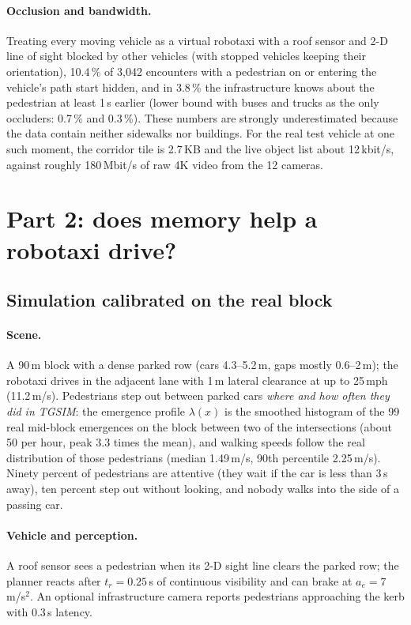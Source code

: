 \documentclass[11pt,a4paper]{article}
\newcommand{\pct}{\,\%}
\begin{document}
\paragraph{Occlusion and bandwidth.}
Treating every moving vehicle as a virtual robotaxi with a roof sensor and 2-D line of sight blocked by other vehicles (with stopped vehicles keeping their orientation), 10.4\pct{} of 3{,}042 encounters with a pedestrian on or entering the vehicle's path start hidden, and in 3.8\pct{} the infrastructure knows about the pedestrian at least 1\,s earlier (lower bound with buses and trucks as the only occluders: 0.7\pct{} and 0.3\pct). These numbers are strongly underestimated because the data contain neither sidewalks nor buildings.
For the real test vehicle at one such moment, the corridor tile is 2.7\,KB and the live object list about 12\,kbit/s, against roughly 180\,Mbit/s of raw 4K video from the 12 cameras.

\section{Part 2: does memory help a robotaxi drive?}
\label{sec:sim}

\subsection{Simulation calibrated on the real block}

\paragraph{Scene.}
A 90\,m block with a dense parked row (cars 4.3--5.2\,m, gaps mostly 0.6--2\,m); the robotaxi drives in the adjacent lane with 1\,m lateral clearance at up to 25\,mph (11.2\,m/s).
Pedestrians step out between parked cars \emph{where and how often they did in TGSIM}: the emergence profile $\lambda(x)$ is the smoothed histogram of the 99 real mid-block emergences on the block between two of the intersections (about 50 per hour, peak 3.3 times the mean), and walking speeds follow the real distribution of those pedestrians (median 1.49\,m/s, 90th percentile 2.25\,m/s).
Ninety percent of pedestrians are attentive (they wait if the car is less than 3\,s away), ten percent step out without looking, and nobody walks into the side of a passing car.

\paragraph{Vehicle and perception.}
A roof sensor sees a pedestrian when its 2-D sight line clears the parked row; the planner reacts after $t_r = 0.25$\,s of continuous visibility and can brake at $a_e = 7$\,m/s$^2$.
An optional infrastructure camera reports pedestrians approaching the kerb with 0.3\,s latency.
\end{document}

